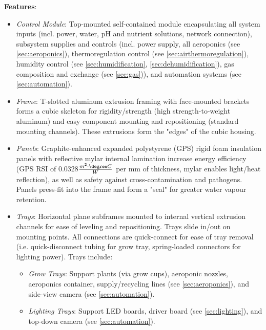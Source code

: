 \textbf{Features}:
\begin{itemize}
    \item \textit{Control Module}: Top-mounted self-contained module encapsulating all system inputs (incl. power, water, pH and nutrient solutions, network connection), subsystem supplies and controls (incl. power supply, all aeroponics (see \ref{sec:aeroponics}), thermoregulation control (see \ref{sec:airthermoregulation}), humidity control (see \ref{sec:humidification}, \ref{sec:dehumidification}), gas composition and exchange (see \ref{sec:gas})), and automation systems (see \ref{sec:automation}).
    \item \textit{Frame}: T-slotted aluminum extrusion framing with face-mounted brackets forms a cubic skeleton for rigidity/strength (high strength-to-weight aluminum) and easy component mounting and repositioning (standard mounting channels). These extrusions form the "edges" of the cubic housing. %
    \item \textit{Panels}: Graphite-enhanced expanded polystyrene (GPS) rigid foam insulation panels \cite{insulation} with reflective mylar internal lamination increase energy efficiency (GPS RSI of 0.0328$\frac{m^2 \cdot \degree C}{W}$ per mm of thickness, mylar enables light/heat reflection), as well as safety against cross-contamination and pathogens. Panels press-fit into the frame and form a "seal" for greater water vapour retention. %
    \item \textit{Trays}: Horizontal plane subframes mounted to internal vertical extrusion channels for ease of leveling and repositioning. Trays slide in/out on mounting points. All connections are quick-connect for ease of tray removal (i.e. quick-disconnect tubing for grow tray, spring-loaded connectors for lighting power). Trays include:
    \begin{itemize}
        \item \textit{Grow Trays}: Support plants (via grow cups), aeroponic nozzles, aeroponics container, supply/recycling lines (see \ref{sec:aeroponics}), and side-view camera (see \ref{sec:automation}).
        \item \textit{Lighting Trays}: Support LED boards, driver board (see \ref{sec:lighting}), and top-down camera (see \ref{sec:automation}).
    \end{itemize}
\end{itemize}